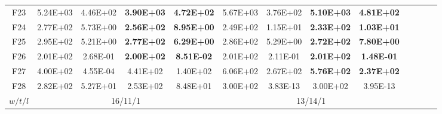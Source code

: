 \begin{table*}[!ht]
\begin{tabular}{|c|cc|cc|cc|cc|cc|cc|}
    F23   & 5.24E+03 & 4.46E+02 & \textbf{3.90E+03} & \textbf{4.72E+02} & 5.67E+03 & 3.76E+02 & \textbf{5.10E+03} & \textbf{4.81E+02} \\
    F24   & 2.77E+02 & 5.73E+00 & \textbf{2.56E+02} & \textbf{8.95E+00} & 2.49E+02 & 1.15E+01 & \textbf{2.33E+02} & \textbf{1.03E+01} \\
    F25   & 2.95E+02 & 5.21E+00 & \textbf{2.77E+02} & \textbf{6.29E+00} & 2.86E+02 & 5.29E+00 & \textbf{2.72E+02} & \textbf{7.80E+00} \\
    F26   & 2.01E+02 & 2.68E-01 & \textbf{2.00E+02} & \textbf{8.51E-02} & 2.01E+02 & 2.11E-01 & \textbf{2.01E+02} & \textbf{1.48E-01} \\
    F27   & 4.00E+02 & 4.55E-04 & 4.41E+02 & 1.40E+02 & 6.06E+02 & 2.67E+02 & \textbf{5.76E+02} & \textbf{2.37E+02} \\
    F28   & 2.82E+02 & 5.27E+01 & 2.53E+02 & 8.48E+01 & 3.00E+02 & 3.83E-13 & 3.00E+02 & 3.95E-13 \\
    \cline{1-9}
    $w/t/l$ & \multicolumn{4}{c|}{16/11/1}   & \multicolumn{4}{c|}{13/14/1} \\
    \cline{1-9}
    \end{tabular}%
  \label{tab:AG_CEC13_advanced30D}%
\end{table*}%

